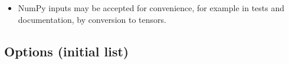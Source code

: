 \documentclass[11pt]{article}
\theoremstyle{definition}
\theoremstyle{remark}
\begin{document}
\begin{itemize}
\begin{itemize}
        on tensors of shape \texttt{(..., *input\_shape)};
      \item \texttt{input\_shape} $= (n, k)$ and \texttt{output\_shape} $= D$;
      \item a flattened variant with \texttt{input\_shape} $= nk$
        (vector-major: component $c$ of $v_i$ at position $ik + c$), because
        IWPC's \texttt{\&} concatenation needs vector inputs;
      \item NumPy-style docstrings, as in IWPC.
    \end{itemize}
    Wrapping the module as an IWPC \texttt{Encoding} should then be a matter
    of a few lines. Echinocoder may ship such an adaptor, provided IWPC is imported
    only when the adaptor is used, so that nothing else in Echinocoder needs
    IWPC installed.
  \item NumPy inputs may be accepted for convenience, for example in tests
    and documentation, by conversion to tensors.
\end{itemize}

\subsection{Options (initial list)}
\end{document}
